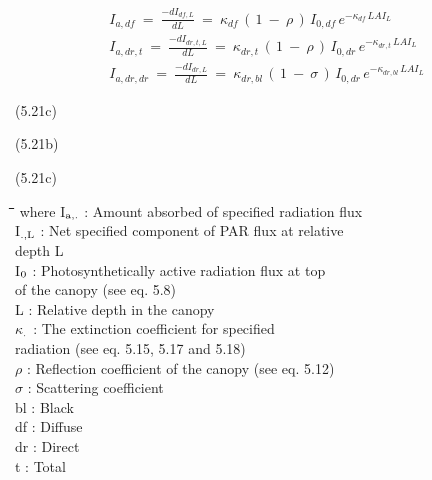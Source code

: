 \documentclass[11pt]{article}
\begin{document}
\begin{eqnarray*}
I _{a,df} ~=~{\frac{-dI _{df,L} }{dL}} ~=~ \kappa _{df} \, (\, 1~-~ \rho \, )\, I _{0,df} \, e ^{- \kappa _{df} \, LAI _{L} } \nonumber  \\
I _{a,dr,t} ~=~{\frac{-dI _{dr,t,L} }{dL}} ~=~ \kappa _{dr,t} \, (\, 1~-~ \rho \, )\, I _{0,dr} \, e ^{- \kappa _{dr,t} \, LAI _{L} } \nonumber  \\
I _{a,dr,dr} ~=~{\frac{-dI _{dr,L} }{dL}} ~=~ \kappa _{dr,bl} \, (\, 1~-~ \sigma \, )\, I _{0,dr} \, e ^{- \kappa _{dr,bl} \, LAI _{L} }
\end{eqnarray*}

 \bigskip
\strut\hfill (5.21c)

\strut\hfill (5.21b)

\strut\hfill (5.21c)

\bigskip
\nwln
\begin{tabbing}
\hspace{1.27cm}\=\hspace{1.27cm}\=\hspace{1.27cm}\=\hspace{1.27cm}\=%
\hspace{1.27cm}\=\hspace{1.27cm}\=\hspace{1.27cm}\=\hspace{1.27cm}\=%
\hspace{1.27cm}\=\hspace{1.27cm}\=\kill
where\> I$_{{\rm a,.}}$\> : Amount absorbed of specified radiation flux \> \> \> \> \> \> \> \> [J m$^{{\rm -2}}$ s$^{{\rm -1}}$]\\
\>I$_{{\rm .,L}}$\> : Net specified component of PAR flux at relative \\
\>\>   depth L\> \> \> \> \> \> \> \> [J m$^{{\rm -2}}$ s$^{{\rm -1}}$]\\
\>I$_{{\rm 0}}$\> : Photosynthetically active radia\-tion flux at top\\
\>\>   of the canopy (see eq. 5.8)\> \> \> \> \> \> \> \> [J m$^{{\rm -2}}$ s$^{{\rm -1}}$]\\
\>L\> : Relative depth in the canopy\> \> \> \> \> \> \> \> [-]\\
\>$\kappa$$_{{\rm .}}$\> : The extinction coefficient for specified\\
\>\>   radiation (see eq. 5.15, 5.17 and 5.18)\> \> \> \> \> \> \> \> [-]\\
\>$\rho$\> : Reflection coefficient of the canopy (see eq. 5.12)\> \> \> \> \> \> \> \> [-]\\
\>$\sigma$\> : Scattering coefficient\> \> \> \> \> \> \> \> [-]\\
\>bl\> : Black\\
\>df\> : Diffuse\\
\>dr\> : Direct\\
\>t\> : Total
\end{tabbing}
\end{document}
